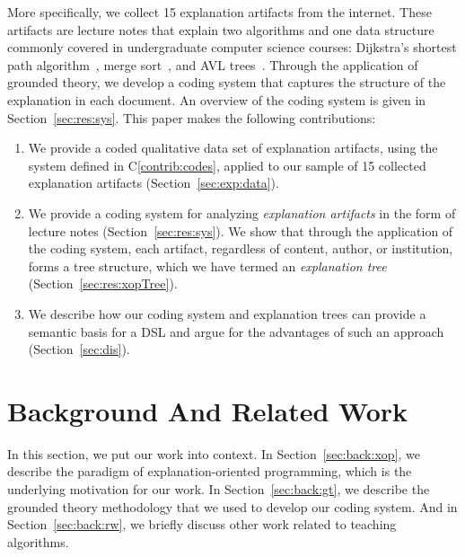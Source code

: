\documentclass[sigconf]{acmart}
\begin{document}
More specifically, we collect 15 explanation artifacts from the internet. These
artifacts are lecture notes that explain two algorithms and one data structure
commonly covered in undergraduate computer science courses: Dijkstra's shortest
path algorithm~\cite[pp.~137--142]{KT06}, merge sort~\cite[210--214]{KT06}, and
AVL trees~\cite[pp.~458--475]{KnuthArt3}.
%
Through the application of grounded theory, we develop a coding system that
captures the structure of the explanation in each document. An overview of the
coding system is given in Section~\ref{sec:res:sys}. This paper makes the
following contributions:
%
\begin{enumerate}[label=C\arabic*.]


\item \label{contrib:data}
%
We provide a coded qualitative data set of explanation artifacts, using the
system defined in C\ref{contrib:codes}, applied to our sample of 15 collected
explanation artifacts (Section~\ref{sec:exp:data}).

\item \label{contrib:codes}
%
We provide a coding system for analyzing \emph{explanation artifacts} in the
form of lecture notes (Section~\ref{sec:res:sys}). We show that through the
application of the coding system, each artifact, regardless of content, author,
or institution, forms a tree structure, which we have termed an
\emph{explanation tree} (Section~\ref{sec:res:xopTree}).


\item \label{contrib:DSL}
%
We describe how our coding system and explanation trees can provide a semantic
basis for a DSL and argue for the advantages of such an approach
(Section~\ref{sec:dis}).
%
\end{enumerate}

\noindent

\section{Background And Related Work}
\label{sec:back}

In this section, we put our work into context.
%
In Section~\ref{sec:back:xop}, we describe the paradigm of explanation-oriented
programming, which is the underlying motivation for our work.
%
In Section~\ref{sec:back:gt}, we describe the grounded theory methodology that
we used to develop our coding system.
%
And in Section~\ref{sec:back:rw}, we briefly discuss other work related to
teaching algorithms.
\end{document}
